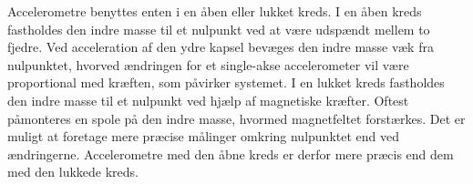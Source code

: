 Accelerometre benyttes enten i en åben eller lukket kreds. I en åben kreds fastholdes den indre masse til et nulpunkt ved at være udspændt mellem to fjedre. Ved acceleration af den ydre kapsel bevæges den indre masse væk fra nulpunktet, hvorved ændringen for et single-akse accelerometer vil være proportional med kræften, som påvirker systemet. \newline
I en lukket kreds fastholdes den indre masse til et nulpunkt ved hjælp af magnetiske kræfter. Oftest påmonteres en spole på den indre masse, hvormed magnetfeltet forstærkes. Det er muligt at foretage mere præcise målinger omkring nulpunktet end ved ændringerne. Accelerometre med den åbne kreds er derfor mere præcis end dem med den lukkede kreds. 
%
%
